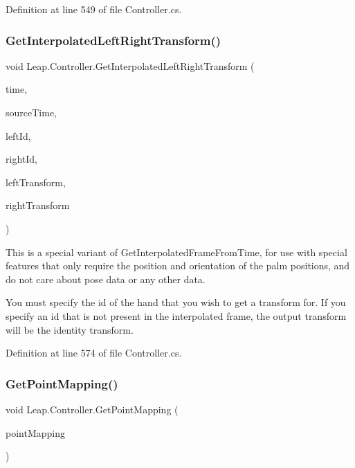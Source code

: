 Definition at line 549 of file Controller.\+cs.

\mbox{\label{class_leap_1_1_controller_a10fe0670c31aa9c8193cde4abd57fcd7}} 
\subsubsection{\texorpdfstring{GetInterpolatedLeftRightTransform()}{GetInterpolatedLeftRightTransform()}}
{\footnotesize\ttfamily void Leap.\+Controller.\+Get\+Interpolated\+Left\+Right\+Transform (\begin{DoxyParamCaption}\item[{Int64}]{time,  }\item[{Int64}]{source\+Time,  }\item[{int}]{left\+Id,  }\item[{int}]{right\+Id,  }\item[{out \mbox{\hyperlink{struct_leap_1_1_leap_transform}{Leap\+Transform}}}]{left\+Transform,  }\item[{out \mbox{\hyperlink{struct_leap_1_1_leap_transform}{Leap\+Transform}}}]{right\+Transform }\end{DoxyParamCaption})}



This is a special variant of Get\+Interpolated\+Frame\+From\+Time, for use with special features that only require the position and orientation of the palm positions, and do not care about pose data or any other data. 

You must specify the id of the hand that you wish to get a transform for. If you specify an id that is not present in the interpolated frame, the output transform will be the identity transform. 

Definition at line 574 of file Controller.\+cs.

\mbox{\label{class_leap_1_1_controller_a513b19658a9928fbcb338eda0dc49a13}} 
\subsubsection{\texorpdfstring{GetPointMapping()}{GetPointMapping()}}
{\footnotesize\ttfamily void Leap.\+Controller.\+Get\+Point\+Mapping (\begin{DoxyParamCaption}\item[{ref \mbox{\hyperlink{struct_leap_1_1_point_mapping}{Point\+Mapping}}}]{point\+Mapping }\end{DoxyParamCaption})}



